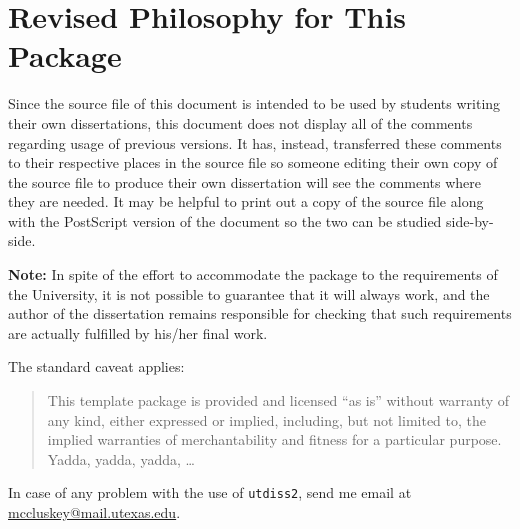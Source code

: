 \section{Revised Philosophy for This Package}
%

Since the source file of this document is intended to be used by students
writing their own dissertations, this document does not display all of the
comments regarding usage of previous versions. It has, instead, transferred
these comments to their respective places in the source file so someone
editing their own copy of the source file to produce their own dissertation
will see the comments where they are needed. It may be helpful to print out
a copy of the source file along with the PostScript version of the document
so the two can be studied side-by-side.

\textbf{Note:} In spite of the effort to accommodate the package to
the requirements of the University, it is not possible to guarantee
that it will always work, and the author of the dissertation remains
responsible for checking that such requirements are actually fulfilled
by his/her final work. 

The standard caveat applies:

\begin{quote}
%
This template package is provided and licensed ``as is'' without warranty
of any kind, either expressed or implied, including, but not limited to,
the implied warranties of merchantability and fitness for a particular
purpose. Yadda, yadda, yadda, \ldots
\end{quote}

In case of any problem with the use of \texttt{utdiss2}, send me email
at \url{mccluskey@mail.utexas.edu}.

